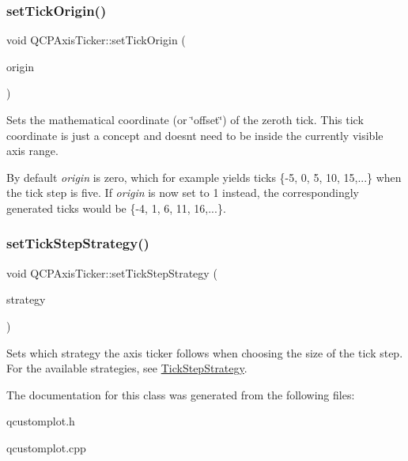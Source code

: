 \subsubsection{\texorpdfstring{set\+Tick\+Origin()}{setTickOrigin()}}
{\footnotesize\ttfamily void Q\+C\+P\+Axis\+Ticker\+::set\+Tick\+Origin (\begin{DoxyParamCaption}\item[{double}]{origin }\end{DoxyParamCaption})}

Sets the mathematical coordinate (or \char`\"{}offset\char`\"{}) of the zeroth tick. This tick coordinate is just a concept and doesn\textquotesingle{}t need to be inside the currently visible axis range.

By default {\itshape origin} is zero, which for example yields ticks \{-\/5, 0, 5, 10, 15,...\} when the tick step is five. If {\itshape origin} is now set to 1 instead, the correspondingly generated ticks would be \{-\/4, 1, 6, 11, 16,...\}. \mbox{\label{classQCPAxisTicker_a73b1d847c1a12159af6bfda4ebebe7d5}} 
\subsubsection{\texorpdfstring{set\+Tick\+Step\+Strategy()}{setTickStepStrategy()}}
{\footnotesize\ttfamily void Q\+C\+P\+Axis\+Ticker\+::set\+Tick\+Step\+Strategy (\begin{DoxyParamCaption}\item[{\hyperlink{classQCPAxisTicker_ab6d2f9d9477821623ac9bc4b21ddf49a}{Q\+C\+P\+Axis\+Ticker\+::\+Tick\+Step\+Strategy}}]{strategy }\end{DoxyParamCaption})}

Sets which strategy the axis ticker follows when choosing the size of the tick step. For the available strategies, see \hyperlink{classQCPAxisTicker_ab6d2f9d9477821623ac9bc4b21ddf49a}{Tick\+Step\+Strategy}. 

The documentation for this class was generated from the following files\+:\begin{DoxyCompactItemize}
\item 
qcustomplot.\+h\item 
qcustomplot.\+cpp\end{DoxyCompactItemize}

